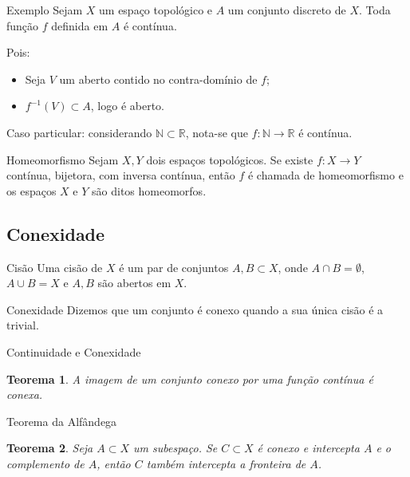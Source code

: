 \documentclass[aspectratio=169]{beamer}
\newtheorem{teo}{Teorema}
\begin{document}
	\begin{frame}{Exemplo}
		Sejam $X$ um espaço topológico e $A$ um conjunto discreto de $X$. Toda função $f$ definida em $A$ é contínua.
		
		Pois:
		\begin{itemize}
			\item Seja $V$ um aberto contido no contra-domínio de $f$;
			\item $f^{-1}(V) \subset A$, logo é aberto.
		\end{itemize}
		Caso particular: considerando $\mathbb{N} \subset \mathbb{R}$, nota-se que $f: \mathbb{N} \to \mathbb{R}$ é contínua.
	\end{frame}
	
	\begin{frame}{Homeomorfismo}
		Sejam $X, Y$ dois espaços topológicos. Se existe $f:X \to Y$ contínua, bijetora, com inversa contínua, então $f$ é chamada de homeomorfismo e os espaços $X$ e $Y$ são ditos homeomorfos.
	\end{frame}
	
	\subsection{Conexidade}
	
	\begin{frame}{Cisão}
		Uma cisão de $X$ é um par de conjuntos $A, B \subset X$, onde $A \cap B = \emptyset$, $A \cup B = X$ e $A, B$ são abertos em $X$.
	\end{frame}
	
	\begin{frame}{Conexidade}
		Dizemos que um conjunto é conexo quando a sua única cisão é a trivial.
	\end{frame}
	
	\begin{frame}{Continuidade e Conexidade}
		\begin{teo}
			A imagem de um conjunto conexo por uma função contínua é conexa.
		\end{teo}
	\end{frame}
	
	\begin{frame}{Teorema da Alfândega}
		\begin{teo}
			Seja $A \subset X$ um subespaço. Se $C \subset X$ é conexo e intercepta $A$ e o complemento de $A$, então $C$ também intercepta a fronteira de $A$.
		\end{teo}
	\end{frame}
	
\end{document}
